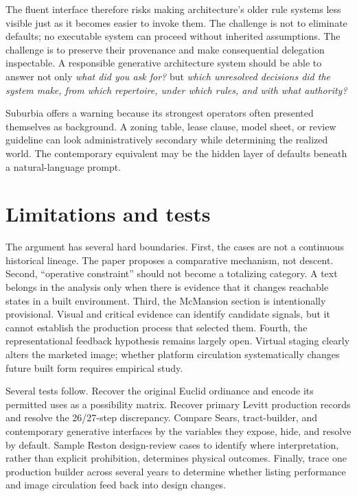\documentclass[11pt]{article}
\begin{document}
The fluent interface therefore risks making architecture's older rule systems less visible just as it becomes easier to invoke them. The challenge is not to eliminate defaults; no executable system can proceed without inherited assumptions. The challenge is to preserve their provenance and make consequential delegation inspectable. A responsible generative architecture system should be able to answer not only \emph{what did you ask for?} but \emph{which unresolved decisions did the system make, from which repertoire, under which rules, and with what authority?}

Suburbia offers a warning because its strongest operators often presented themselves as background. A zoning table, lease clause, model sheet, or review guideline can look administratively secondary while determining the realized world. The contemporary equivalent may be the hidden layer of defaults beneath a natural-language prompt.

\section{Limitations and tests}
The argument has several hard boundaries. First, the cases are not a continuous historical lineage. The paper proposes a comparative mechanism, not descent. Second, ``operative constraint'' should not become a totalizing category. A text belongs in the analysis only when there is evidence that it changes reachable states in a built environment. Third, the McMansion section is intentionally provisional. Visual and critical evidence can identify candidate signals, but it cannot establish the production process that selected them. Fourth, the representational feedback hypothesis remains largely open. Virtual staging clearly alters the marketed image; whether platform circulation systematically changes future built form requires empirical study.

Several tests follow. Recover the original Euclid ordinance and encode its permitted uses as a possibility matrix. Recover primary Levitt production records and resolve the 26/27-step discrepancy. Compare Sears, tract-builder, and contemporary generative interfaces by the variables they expose, hide, and resolve by default. Sample Reston design-review cases to identify where interpretation, rather than explicit prohibition, determines physical outcomes. Finally, trace one production builder across several years to determine whether listing performance and image circulation feed back into design changes.
\end{document}
